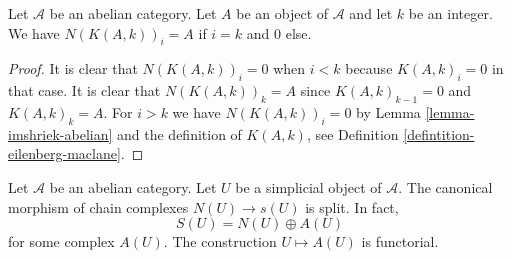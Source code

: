 \begin{lemma}
\label{lemma-N-K}
Let $\mathcal{A}$ be an abelian category.
Let $A$ be an object of $\mathcal{A}$ and
let $k$ be an integer. We have
$N(K(A, k))_i = A$ if $i = k$ and
$0$ else.
\end{lemma}

\begin{proof}
It is clear that $N(K(A, k))_i = 0$ when $i < k$
because $K(A, k)_i = 0$ in that case.
It is clear that $N(K(A, k))_k = A$ since
$K(A, k)_{k - 1} = 0$ and $K(A, k)_k = A$.
For $i > k$ we have $N(K(A, k))_i = 0$
by Lemma \ref{lemma-imshriek-abelian} and
the definition of $K(A, k)$, see Definition
\ref{defintition-eilenberg-maclane}.
\end{proof}

\begin{lemma}
\label{lemma-decompose-associated-complexes}
Let $\mathcal{A}$ be an abelian category.
Let $U$ be a simplicial object of $\mathcal{A}$.
The canonical morphism of chain complexes
$N(U) \to s(U)$ is split. In fact,
$$
S(U) = N(U) \oplus A(U)
$$
for some complex $A(U)$. The construction $U \mapsto A(U)$
is functorial.
\end{lemma}

